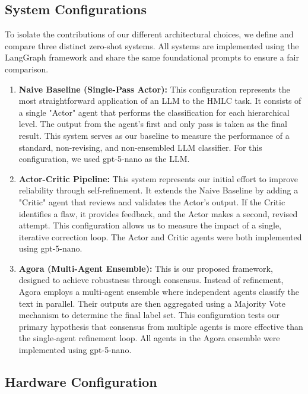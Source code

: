 \subsection{System Configurations}

To isolate the contributions of our different architectural choices, we define and compare three distinct zero-shot systems. All systems are implemented using the LangGraph framework \cite{langgraph2024} and share the same foundational prompts to ensure a fair comparison.

\begin{enumerate}
\item \textbf{Naive Baseline (Single-Pass Actor):}
This configuration represents the most straightforward application of an LLM to the HMLC task. It consists of a single "Actor" agent that performs the classification for each hierarchical level. The output from the agent's first and only pass is taken as the final result. This system serves as our baseline to measure the performance of a standard, non-revising, and non-ensembled LLM classifier. For this configuration, we used gpt-5-nano as the LLM.

\item \textbf{Actor-Critic Pipeline:}
This system represents our initial effort to improve reliability through self-refinement. It extends the Naive Baseline by adding a "Critic" agent that reviews and validates the Actor's output. If the Critic identifies a flaw, it provides feedback, and the Actor makes a second, revised attempt. This configuration allows us to measure the impact of a single, iterative correction loop. The Actor and Critic agents were both implemented using gpt-5-nano.

\item \textbf{Agora (Multi-Agent Ensemble):}
This is our proposed framework, designed to achieve robustness through consensus. Instead of refinement, Agora employs a multi-agent ensemble where independent agents classify the text in parallel. Their outputs are then aggregated using a Majority Vote mechanism to determine the final label set. This configuration tests our primary hypothesis that consensus from multiple agents is more effective than the single-agent refinement loop. All agents in the Agora ensemble were implemented using gpt-5-nano.
\end{enumerate}

\subsection{Hardware Configuration}

